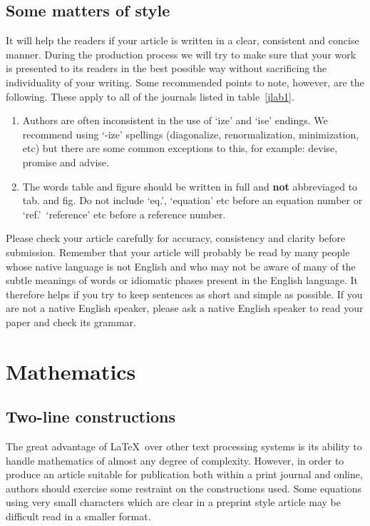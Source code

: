 \documentclass[12pt]{iopart}
\begin{document}
\subsection{Some matters of style}
It will help the readers if your article is written in a clear,
consistent and concise manner. During the production process
we will try to make sure that your work is presented to its
readers in the best possible way without sacrificing the individuality of
your writing. Some recommended 
points to note, however, are the following.  These apply to all of the journals listed
in table~\ref{jlab1}.
\begin{enumerate}
\item Authors are often inconsistent in the use of `ize' and `ise' endings.
We recommend using `-ize' spellings (diagonalize, 
renormalization, minimization, etc) but there are some common 
exceptions to this, for example: devise, 
promise and advise.

\item The words table and figure should be written 
in full and {\bf not} abbreviaged to tab. and fig. Do not include `eq.', `equation' etc before an equation number or `ref.'\, `reference' etc before a reference number.
\end{enumerate}

Please check your article carefully for accuracy, consistency and clarity before
submission. Remember that your article will probably be read by many
people whose native language is not English and who may not  
be aware of many of the subtle meanings of words or idiomatic phases
present in the English language. It therefore helps if you try to keep
sentences as short and simple as possible.  If you are not a native English speaker,
please ask a native English speaker to read your paper and check its grammar.

\section{Mathematics}
\subsection{Two-line constructions}
The great advantage of \LaTeX\ 
over other text processing systems is its 
ability to handle mathematics of almost any degree of complexity. However, 
in order to produce an article suitable for publication both within a print journal and online, 
authors should exercise some restraint on the constructions used. Some equations using very small characters which are clear in a preprint style article may be difficult read in a smaller format.
\end{document}
